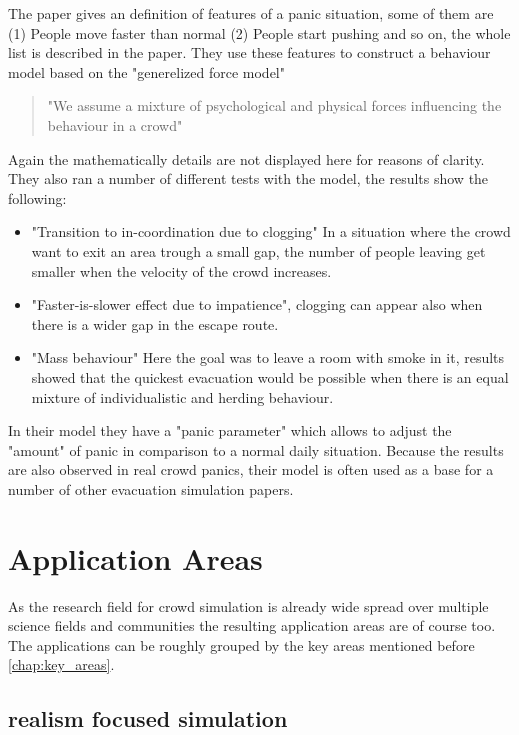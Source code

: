 \documentclass{acmsiggraph}               %
\begin{document}
The paper gives an definition of features of a panic situation, some of them are (1) People move faster than normal (2) People start pushing and so on, the whole list is described in the paper. They use these features to construct a behaviour model based on the "generelized force model"\cite{hindsley_investigation_1986}
\begin{quote}
"We assume a mixture of psychological and physical forces influencing the behaviour in a crowd"
\end{quote}
Again the mathematically details are not displayed here for reasons of clarity. They also ran a number of different tests with the model, the results show the following:
\begin{itemize}
\item "Transition to in-coordination due to clogging" In a situation where the crowd want to exit an area trough a small gap, the number of people leaving get smaller when the velocity of the crowd increases.
\item "Faster-is-slower effect due to impatience", clogging can appear also when there is a wider gap in the escape route. 
\item "Mass behaviour" Here the goal was to leave a room with smoke in it, results showed that the quickest evacuation would be possible when there is an equal mixture of individualistic and herding behaviour. 
\end{itemize}
In their model they have a "panic parameter" \label{term:panicParameter} which allows to adjust the "amount" of panic in comparison to a normal daily situation. Because the results are also observed in real crowd panics, their model is often used as a base for a number of other evacuation simulation papers. \cite{braun_simulating_2005} \cite{zheng_modeling_2009}

\section{Application Areas}

As the research field for crowd simulation is already wide spread over multiple science fields and communities the resulting application areas are of course too. The applications can be roughly grouped by the key areas mentioned before \ref{chap:key_areas}. 

\subsection{realism focused simulation}
\end{document}
